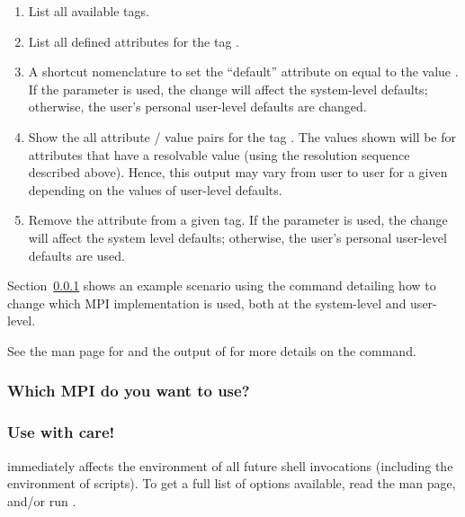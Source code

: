 \begin{enumerate}
\item {}
  
  List all available tags.

\item {}
  
  List all defined attributes for the tag .

\item {} 
  
  A shortcut nomenclature to set the ``default'' attribute on
   equal to the value .  If the
   parameter is used, the change will affect the
  system-level defaults; otherwise, the user's personal user-level
  defaults are changed.

\item {}

  Show the all attribute / value pairs for the tag .  The
  values shown will be for attributes that have a resolvable value
  (using the resolution sequence described above).  Hence, this output
  may vary from user to user for a given  depending on the
  values of user-level defaults.

\item {} 
  
  Remove the attribute  from a given tag.  If the
   parameter is used, the change will affect the system
  level defaults; otherwise, the user's personal user-level defaults
  are used.
  
\end{enumerate}

Section~\ref{app:switcher-which-mpi-to-use} shows an example scenario
using the  command detailing how to change which MPI
implementation is used, both at the system-level and user-level.

See the man page for  and the output of  for more details on the  command.


\subsubsection{Which MPI do you want to use?}
\label{app:switcher-which-mpi-to-use}




\subsubsection{Use  with care!}

 immediately affects the environment of all future shell
invocations (including the environment of scripts).  To get a full
list of options available, read the  man page, and/or
run .
